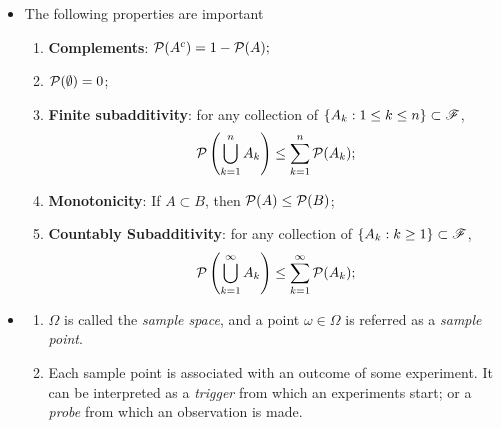 \documentclass[11pt]{article}
\begin{document}
\begin{itemize}
\item \begin{proposition}
The following properties are important
\begin{enumerate}
\item \textbf{Complements}: ${\mathcal P}(A^{c}) = 1- {\mathcal P}(A);$
\item ${\mathcal P}(\emptyset) = 0$;
\item \textbf{Finite subadditivity}: for any collection of $\left\{A_{k}: 1\le k\le n\right\}\subset {\mathscr F}$,
  $${\mathcal P}\left(\bigcup_{k=1}^{n}A_{k}\right)\le \sum_{k=1}^{n}{\mathcal P}(A_{k});$$
\item \textbf{Monotonicity}: If $A\subset B$, then ${\mathcal P}(A)\le {\mathcal P}(B)$;
\item \textbf{Countably Subadditivity}:  for any collection of $\left\{A_{k}: k\ge 1\right\}\subset {\mathscr F}$,
   $${\mathcal P}\left(\bigcup_{k=1}^{\infty}A_{k}\right)\le \sum_{k=1}^{\infty}{\mathcal P}(A_{k});$$
\end{enumerate}
\end{proposition}

\item \begin{remark}\citep{billingsley2008probability}
\begin{enumerate}
\item $\Omega$ is called the \emph{sample space}, and a point $\omega\in \Omega$ is referred as a \emph{sample point}. 

\item Each sample point is associated with an outcome of some experiment. It can be interpreted as a \emph{trigger} from which an experiments start; or a \emph{probe} from which an observation is made.  


\end{enumerate}
\end{remark}
\end{itemize}
\end{document}
